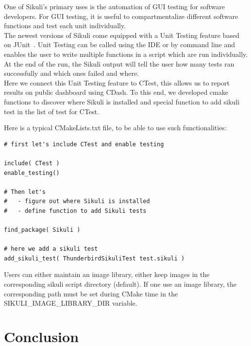 \documentclass{InsightArticle}
\begin{document}
One of Sikuli's primary uses is the automation of GUI testing for software
developers. For GUI testing, it is useful to compartmentalize different software
functions and test each unit individually.\\

The newest versions of Sikuli come equipped with a Unit Testing feature based
on JUnit~\cite{JUnit:Website}. Unit Testing can be called using the IDE or by
command line and enables the user to write multiple functions in a script which
are run individually. At the end of the run, the Sikuli output will tell the
user how many tests ran successfully and which ones failed and where.\\

Here we connect this Unit Testing feature to CTest, this allows us to report
results on public dashboard using CDash. To this end, we developed cmake
functions to discover where Sikuli is installed and special function to add
sikuli test in the list of test for CTest.

Here is a typical CMakeLists.txt file, to be able to use such functionalities:

\begin{verbatim}
# first let's include CTest and enable testing

include( CTest )
enable_testing()

# Then let's
#   - figure out where Sikuli is installed
#   - define function to add Sikuli tests

find_package( Sikuli )

# here we add a sikuli test
add_sikuli_test( ThunderbirdSikuliTest test.sikuli )
\end{verbatim}

Users can either maintain an image library, either keep images in the
corresponding sikuli script directory (default). If one use an image library,
the corresponding path must be set during CMake time in
the SIKULI\_IMAGE\_LIBRARY\_DIR variable.


\section{Conclusion}

\clearpage



\end{document}
